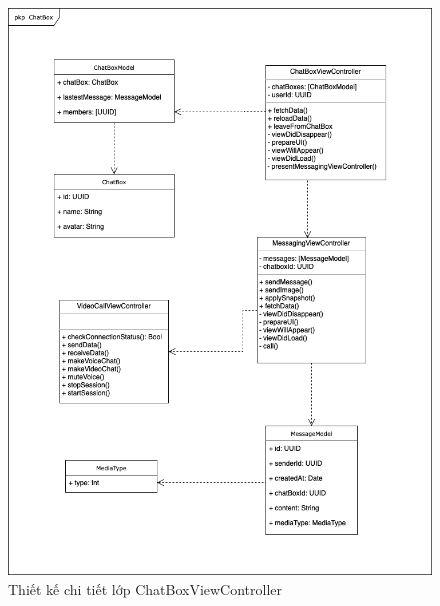 \documentclass[../DoAn.tex]{subfiles}
\begin{document}
\begin{figure}[H]
    \centering
    \includegraphics[width=1\linewidth]{Hinhve/Class/Detail_ChatboxViewController_Class_PKP.png}
    \caption{Thiết kế chi tiết lớp ChatBoxViewController}
    \label{fig:use_case_tổng_quan}
\end{figure}
\end{document}
